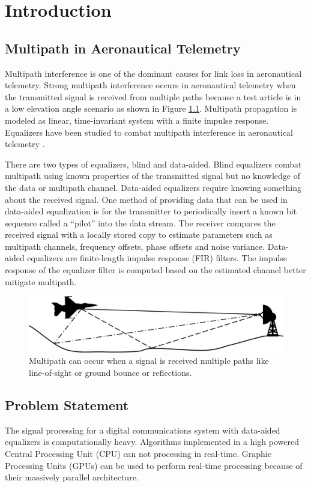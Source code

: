 \chapter{Introduction}
\section{Multipath in Aeronautical Telemetry}
Multipath interference is one of the dominant causes for link loss in aeronautical telemetry.
Strong multipath interference occurs in aeronautical telemetry when the transmitted signal is received from multiple paths because a test article is in a low elevation angle scenario as shown in Figure \ref{fig:multipath}.
Multipath propagation is modeled as linear, time-invariant system with a finite impulse response.
Equalizers have been studied to combat multipath interference in aeronautical telemetry \cite{rice-afran-saquib:2014,rice-afran-saquib-cole-rhodes-moazzami:2014}.

There are two types of equalizers, blind and data-aided.
Blind equalizers combat multipath using known properties of the transmitted signal but no knowledge of the data or multipath channel.
Data-aided equalizers require knowing something about the received signal.
One method of providing data that can be used in data-aided equalization is for the transmitter to periodically insert a known bit sequence called a ``pilot'' into the data stream.
The receiver compares the received signal with a locally stored copy to estimate parameters such as multipath channels, frequency offsets, phase offsets and noise variance.
Data-aided equalizers are finite-length impulse response (FIR) filters. The impulse response of the equalizer filter is computed based on the estimated channel better mitigate multipath.
\begin{figure}
	\centering\includegraphics[width=12.11in/100*50]{figures/intro/Picture1.jpg}
	\caption{Multipath can occur when a signal is received multiple paths like line-of-sight or ground bounce or reflections.}
	\label{fig:multipath}
\end{figure}
\section{Problem Statement}
The signal processing for a digital communications system with data-aided equalizers is computationally heavy.
Algorithms implemented in a high powered Central Processing Unit (CPU) can not processing in real-time.
Graphic Processing Units (GPUs) can be used to perform real-time processing because of their massively parallel architecture.

